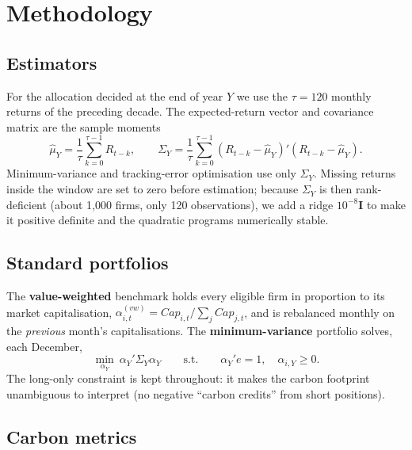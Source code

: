 \documentclass[11pt,a4paper]{article}
\begin{document}
\section{Methodology}

\subsection{Estimators}

For the allocation decided at the end of year $Y$ we use the
$\tau=120$ monthly returns of the preceding decade. The expected-return vector
and covariance matrix are the sample moments
\begin{equation}
\hat{\mu}_Y=\frac{1}{\tau}\sum_{k=0}^{\tau-1}R_{t-k},
\qquad
\Sigma_Y=\frac{1}{\tau}\sum_{k=0}^{\tau-1}
(R_{t-k}-\hat{\mu}_Y)'(R_{t-k}-\hat{\mu}_Y).
\end{equation}
Minimum-variance and tracking-error optimisation use only $\Sigma_Y$. Missing
returns inside the window are set to zero before estimation; because
$\Sigma_Y$ is then rank-deficient (about 1{,}000 firms, only 120
observations), we add a ridge $10^{-8}\mathbf{I}$ to make it positive definite
and the quadratic programs numerically stable.

\subsection{Standard portfolios}

The \textbf{value-weighted} benchmark holds every eligible firm in proportion to
its market capitalisation, $\alpha^{(vw)}_{i,t}=Cap_{i,t}/\sum_j Cap_{j,t}$, and
is rebalanced monthly on the \emph{previous} month's capitalisations. The
\textbf{minimum-variance} portfolio solves, each December,
\begin{equation}
\min_{\alpha_Y}\ \alpha_Y'\Sigma_Y\alpha_Y
\qquad\text{s.t.}\qquad
\alpha_Y'e=1,\quad \alpha_{i,Y}\ge 0 .
\label{eq:mv}
\end{equation}
The long-only constraint is kept throughout: it makes the carbon footprint
unambiguous to interpret (no negative ``carbon credits'' from short positions).

\subsection{Carbon metrics}
\end{document}
